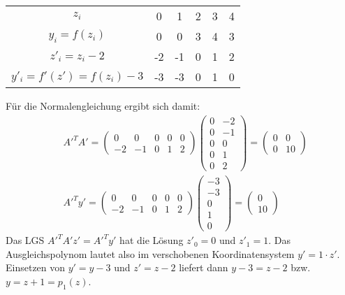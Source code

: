\begin{tabular}{c|ccccc}
  $z_i$ & 0 & 1 & 2 & 3 & 4\\
  $y_i = f(z_i)$ & 0 & 0 & 3 & 4 & 3 \\
  \hline
  $z'_i = z_i - 2$ & -2 & -1 & 0 & 1 & 2\\
  $y'_i = f'(z') = f(z_i) - 3$ & -3 & -3 & 0 & 1 & 0
\end{tabular}
Für die Normalengleichung ergibt sich damit:
\begin{align*}
  & A'^T A' =  \begin{pmatrix} 0 & 0 & 0 & 0 & 0 \\ -2 & -1 & 0 & 1 & 2 \end{pmatrix}
   \begin{pmatrix} 0 & -2 \\ 0 & -1 \\ 0 & 0 \\ 0 & 1 \\ 0 & 2 \end{pmatrix} =
   \begin{pmatrix} 0 & 0  \\ 0 & 10 \end{pmatrix} \\
  & A'^T y'= \begin{pmatrix} 0 & 0 & 0 & 0 & 0 \\ -2 & -1 & 0 & 1 & 2 \end{pmatrix}
   \begin{pmatrix} -3 \\ -3 \\ 0 \\ 1 \\ 0 \end{pmatrix} = \begin{pmatrix}0 \\10 \end{pmatrix}
\end{align*}
Das LGS $A'^T A' z' = A'^T y'$ hat die Lösung $z'_0 = 0$ und $z'_1 = 1$. Das
Ausgleichspolynom lautet also im verschobenen Koordinatensystem $y' = 1 \cdot z'$.
Einsetzen von $y' = y - 3$ und $z' = z - 2$ liefert dann $y - 3 = z - 2$ bzw. $y = z + 1 = p_1(z)$.


